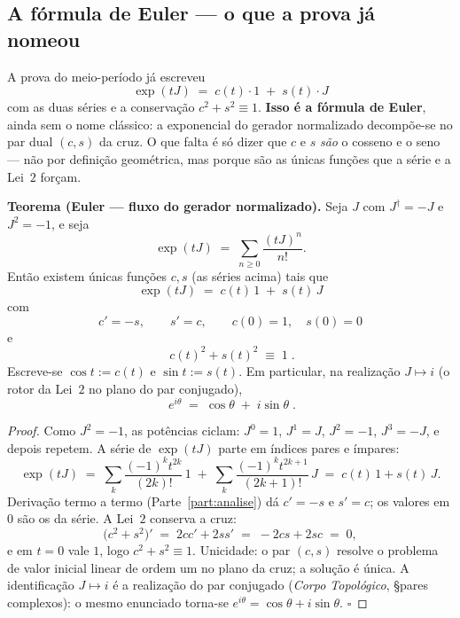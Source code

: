 \documentclass[livro.tex]{subfiles}
\begin{document}
\subsection{A fórmula de Euler --- o que a prova já nomeou}\label{sec:euler}

\noindent A prova do meio-período já escreveu
\[
  \exp(tJ) \;=\; c(t)\cdot 1 \;+\; s(t)\cdot J
\]
com as duas séries e a conservação $c^{2}+s^{2}\equiv1$. \textbf{Isso é a fórmula de Euler},
ainda sem o nome clássico: a exponencial do gerador normalizado decompõe-se no par dual
$(c,s)$ da cruz. O que falta é só dizer que $c$ e $s$ \emph{são} o cosseno e o seno --- não
por definição geométrica, mas porque são as únicas funções que a série e a Lei~$2$ forçam.

\begin{mdframed}[linewidth=0.4pt,innerleftmargin=10pt,innerrightmargin=10pt,
                 innertopmargin=8pt,innerbottommargin=8pt,skipabove=6pt,skipbelow=6pt]
\textbf{Teorema (Euler --- fluxo do gerador normalizado).}\label{thm:euler}
Seja $J$ com $J^{\dagger}=-J$ e $J^{2}=-1$, e seja
\[
  \exp(tJ) \;=\; \sum_{n\geq0}\frac{(tJ)^{n}}{n!}.
\]
Então existem únicas funções $c,s$ (as séries acima) tais que
\[
  \boxed{\;\exp(tJ) \;=\; c(t)\,1 \;+\; s(t)\,J\;}
\]
com
\[
  \boxed{\;c'= -s,\qquad s'= c,\qquad c(0)=1,\quad s(0)=0\;}
\]
e
\[
  \boxed{\;c(t)^{2}+s(t)^{2}\;\equiv\;1\;}.
\]
Escreve-se $\cos t := c(t)$ e $\sin t := s(t)$. Em particular, na realização
$J\mapsto i$ (o rotor da Lei~$2$ no plano do par conjugado),
\[
  \boxed{\;e^{i\theta} \;=\; \cos\theta \;+\; i\sin\theta\;}.
\]
\end{mdframed}

\begin{proof}
Como $J^{2}=-1$, as potências ciclam: $J^{0}=1$, $J^{1}=J$, $J^{2}=-1$, $J^{3}=-J$, e
depois repetem. A série de $\exp(tJ)$ parte em índices pares e ímpares:
\[
  \exp(tJ)
  \;=\;
  \sum_{k}\frac{(-1)^{k}t^{2k}}{(2k)!}\,1
  \;+\;
  \sum_{k}\frac{(-1)^{k}t^{2k+1}}{(2k+1)!}\,J
  \;=\;
  c(t)\,1+s(t)\,J.
\]
Derivação termo a termo (Parte~\ref{part:analise}) dá $c'=-s$ e $s'=c$; os valores em
$0$ são os da série. A Lei~$2$ conserva a cruz:
\[
  \bigl(c^{2}+s^{2}\bigr)'
  \;=\;
  2cc'+2ss'
  \;=\;
  -2cs+2sc
  \;=\;
  0,
\]
e em $t=0$ vale $1$, logo $c^{2}+s^{2}\equiv1$. Unicidade: o par $(c,s)$ resolve o
problema de valor inicial linear de ordem um no plano da cruz; a solução é única. A
identificação $J\mapsto i$ é a realização do par conjugado
(\emph{Corpo Topológico}, \S pares complexos): o mesmo enunciado torna-se
$e^{i\theta}=\cos\theta+i\sin\theta$. $\square$
\end{proof}
\end{document}
